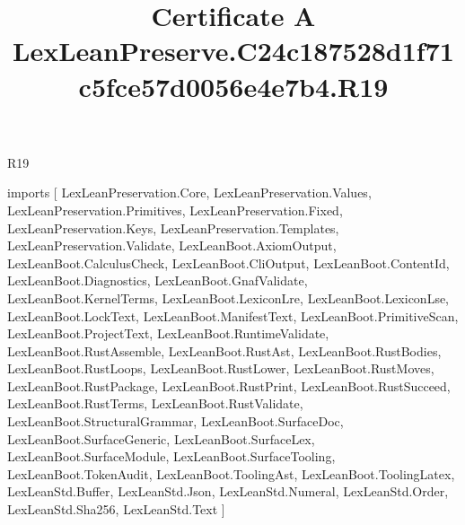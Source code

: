\begin{lexlean}{R19}
\title{Certificate A LexLeanPreserve.C24c187528d1f71c5fce57d0056e4e7b4.R19}
\begin{coremodule}
imports [
  LexLeanPreservation.Core,
  LexLeanPreservation.Values,
  LexLeanPreservation.Primitives,
  LexLeanPreservation.Fixed,
  LexLeanPreservation.Keys,
  LexLeanPreservation.Templates,
  LexLeanPreservation.Validate,
  LexLeanBoot.AxiomOutput,
  LexLeanBoot.CalculusCheck,
  LexLeanBoot.CliOutput,
  LexLeanBoot.ContentId,
  LexLeanBoot.Diagnostics,
  LexLeanBoot.GnafValidate,
  LexLeanBoot.KernelTerms,
  LexLeanBoot.LexiconLre,
  LexLeanBoot.LexiconLse,
  LexLeanBoot.LockText,
  LexLeanBoot.ManifestText,
  LexLeanBoot.PrimitiveScan,
  LexLeanBoot.ProjectText,
  LexLeanBoot.RuntimeValidate,
  LexLeanBoot.RustAssemble,
  LexLeanBoot.RustAst,
  LexLeanBoot.RustBodies,
  LexLeanBoot.RustLoops,
  LexLeanBoot.RustLower,
  LexLeanBoot.RustMoves,
  LexLeanBoot.RustPackage,
  LexLeanBoot.RustPrint,
  LexLeanBoot.RustSucceed,
  LexLeanBoot.RustTerms,
  LexLeanBoot.RustValidate,
  LexLeanBoot.StructuralGrammar,
  LexLeanBoot.SurfaceDoc,
  LexLeanBoot.SurfaceGeneric,
  LexLeanBoot.SurfaceLex,
  LexLeanBoot.SurfaceModule,
  LexLeanBoot.SurfaceTooling,
  LexLeanBoot.TokenAudit,
  LexLeanBoot.ToolingAst,
  LexLeanBoot.ToolingLatex,
  LexLeanStd.Buffer,
  LexLeanStd.Json,
  LexLeanStd.Numeral,
  LexLeanStd.Order,
  LexLeanStd.Sha256,
  LexLeanStd.Text
]


\end{coremodule}
\end{lexlean}

